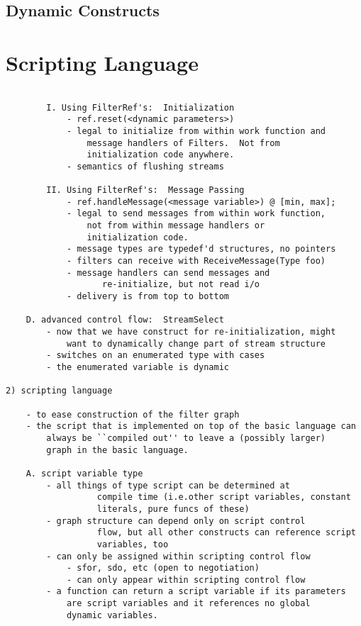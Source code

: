 \documentclass[draft]{article}
\begin{document}
\subsection{Dynamic Constructs}
\protect\label{sec:dynamic}

\section{Scripting Language}
\label{sec:script}

\begin{verbatim}

		I. Using FilterRef's:  Initialization
			- ref.reset(<dynamic parameters>)
			- legal to initialize from within work function and
				message handlers of Filters.  Not from 
				initialization code anywhere.
			- semantics of flushing streams

		II. Using FilterRef's:  Message Passing
			- ref.handleMessage(<message variable>) @ [min, max];
			- legal to send messages from within work function, 
				not from within message handlers or
				initialization code.
			- message types are typedef'd structures, no pointers
			- filters can receive with ReceiveMessage(Type foo)
			- message handlers can send messages and
				   re-initialize, but not read i/o
			- delivery is from top to bottom

	D. advanced control flow:  StreamSelect
		- now that we have construct for re-initialization, might
			want to dynamically change part of stream structure
		- switches on an enumerated type with cases
		- the enumerated variable is dynamic

2) scripting language

	- to ease construction of the filter graph
	- the script that is implemented on top of the basic language can
		always be ``compiled out'' to leave a (possibly larger) 
		graph in the basic language.

	A. script variable type
		- all things of type script can be determined at
                  compile time (i.e.other script variables, constant
                  literals, pure funcs of these)
		- graph structure can depend only on script control
                  flow, but all other constructs can reference script
                  variables, too
		- can only be assigned within scripting control flow
			- sfor, sdo, etc (open to negotiation)
			- can only appear within scripting control flow
		- a function can return a script variable if its parameters
			are script variables and it references no global
			dynamic variables.  


\end{verbatim}
\end{document}
